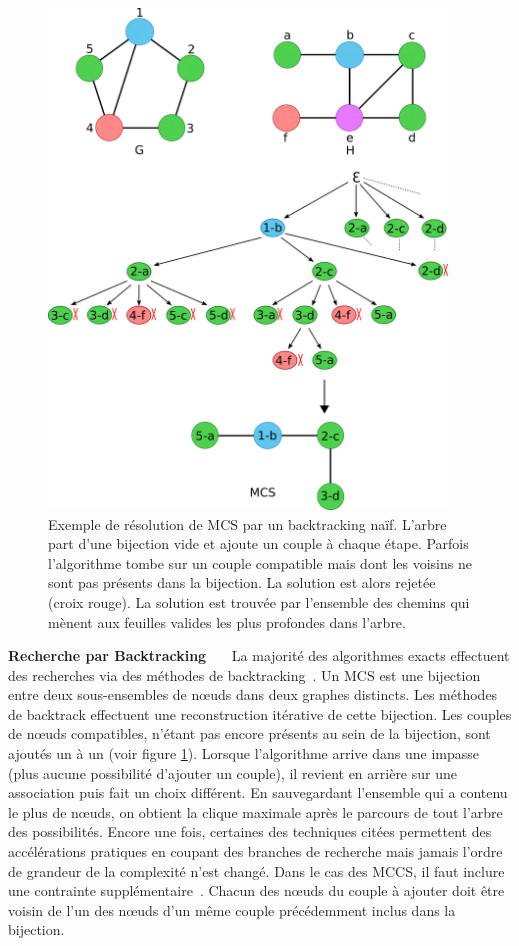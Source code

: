 \begin{figure}[!ht]
  \begin{center}
    \includegraphics[width=400px]{Figures/s2m/MCS-SI/backtracking_solve.png}
    \caption{\label{backtracking_solve}Exemple de résolution de MCS par un backtracking naïf.
    L'arbre part d'une bijection vide et ajoute un couple à chaque étape.
    Parfois l'algorithme tombe sur un couple compatible mais dont les voisins ne sont pas présents dans la bijection.
    La solution est alors rejetée (croix rouge).
    La solution est trouvée par l'ensemble des chemins qui mènent aux feuilles valides les plus profondes dans l'arbre.}
  \end{center}
\end{figure}


\textbf{Recherche par Backtracking}~~~
La majorité des algorithmes exacts effectuent des recherches via des méthodes de backtracking~\cite{manic_branch&cut_2009,mcgregor_backtrack_1982,kawabata_build-up_2011}.
Un MCS est une bijection entre deux sous-ensembles de n\oe{}uds dans deux graphes distincts.
Les méthodes de backtrack effectuent une reconstruction itérative de cette bijection.
Les couples de n\oe{}uds compatibles, n'étant pas encore présents au sein de la bijection, sont ajoutés un à un (voir figure \ref{backtracking_solve}).
Lorsque l'algorithme arrive dans une impasse (plus aucune possibilité d'ajouter un couple), il revient en arrière sur une association puis fait un choix différent.
En sauvegardant l'ensemble qui a contenu le plus de n\oe{}uds, on obtient la clique maximale après le parcours de tout l'arbre des possibilités.
Encore une fois, certaines des techniques citées permettent des accélérations pratiques en coupant des branches de recherche mais jamais l'ordre de grandeur de la complexité n'est changé.
Dans le cas des MCCS, il faut inclure une contrainte supplémentaire~\cite{chang_moderately_2014}.
Chacun des n\oe{}uds du couple à ajouter doit être voisin de l'un des n\oe{}uds d'un même couple précédemment inclus dans la bijection.

